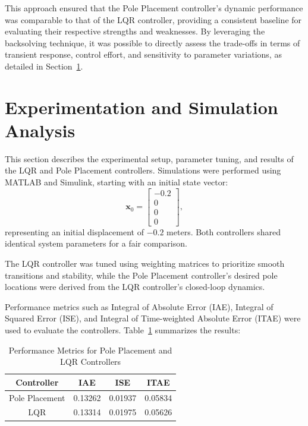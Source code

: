\documentclass[conference]{IEEEtran}
\begin{document}
This approach ensured that the Pole Placement controller's dynamic performance was comparable to that of the LQR controller, providing a consistent baseline for evaluating their respective strengths and weaknesses. By leveraging the backsolving technique, it was possible to directly assess the trade-offs in terms of transient response, control effort, and sensitivity to parameter variations, as detailed in Section~\ref{sec:experiment_analysis}.

\section{Experimentation and Simulation Analysis}
\label{sec:experiment_analysis}

This section describes the experimental setup, parameter tuning, and results of the LQR and Pole Placement controllers. Simulations were performed using MATLAB and Simulink, starting with an initial state vector:
\[
\mathbf{x}_0 = \begin{bmatrix} -0.2 \\ 0 \\ 0 \\ 0 \end{bmatrix},
\]
representing an initial displacement of \(-0.2\) meters. Both controllers shared identical system parameters for a fair comparison.

The LQR controller was tuned using weighting matrices to prioritize smooth transitions and stability, while the Pole Placement controller's desired pole locations were derived from the LQR controller's closed-loop dynamics.

Performance metrics such as Integral of Absolute Error (IAE), Integral of Squared Error (ISE), and Integral of Time-weighted Absolute Error (ITAE) were used to evaluate the controllers. Table~\ref{tab:performance_metrics} summarizes the results:

\begin{table}[H]
\centering
\caption{Performance Metrics for Pole Placement and LQR Controllers}
\label{tab:performance_metrics}
\begin{tabular}{|c|c|c|c|}
\hline
\textbf{Controller} & \textbf{IAE}   & \textbf{ISE}   & \textbf{ITAE}  \\ \hline
Pole Placement      & 0.13262        & 0.01937        & 0.05834        \\ \hline
LQR                 & 0.13314        & 0.01975        & 0.05626        \\ \hline
\end{tabular}
\end{table}
\end{document}
